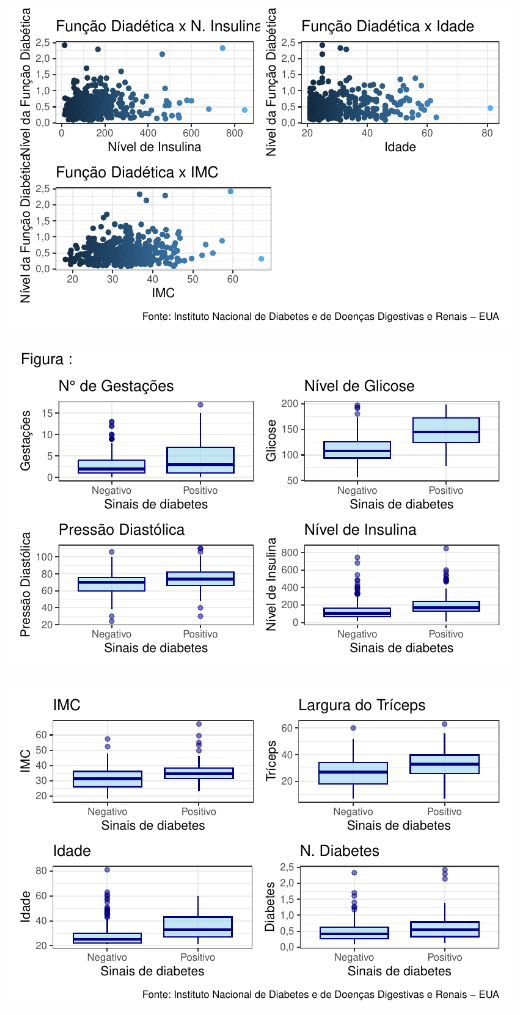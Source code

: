 \documentclass[
  letterpaper,
  DIV=11,
  numbers=noendperiod]{scrartcl}
\begin{document}
\includegraphics{relatorio_lab1_files/figure-pdf/unnamed-chunk-11-2.pdf}

\includegraphics{relatorio_lab1_files/figure-pdf/unnamed-chunk-12-1.pdf}

\includegraphics{relatorio_lab1_files/figure-pdf/unnamed-chunk-12-2.pdf}
\end{document}
